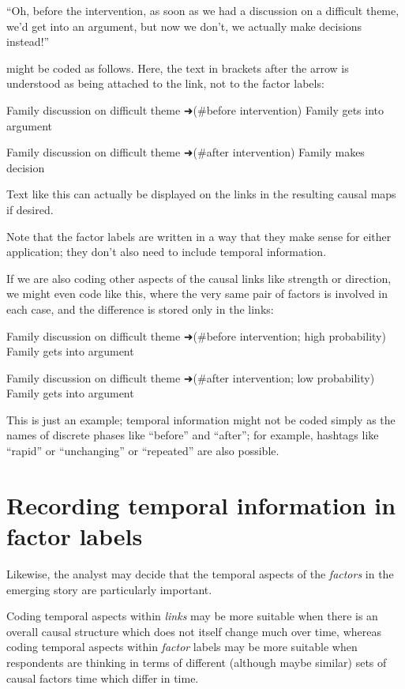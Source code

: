 \documentclass[
]{book}
\begin{document}
``Oh, before the intervention, as soon as we had a discussion on a difficult theme, we'd get into an argument, but now we don't, we actually make decisions instead!''

might be coded as follows. Here, the text in brackets after the arrow is understood as being attached to the link, not to the factor labels:

Family discussion on difficult theme ➜(\#before intervention) Family gets into argument

Family discussion on difficult theme ➜(\#after intervention) Family makes decision

Text like this can actually be displayed on the links in the resulting causal maps if desired.

Note that the factor labels are written in a way that they make sense for either application; they don't also need to include temporal information.

If we are also coding other aspects of the causal links like strength or direction, we might even code like this, where the very same pair of factors is involved in each case, and the difference is stored only in the links:

Family discussion on difficult theme ➜(\#before intervention; high probability) Family gets into argument

Family discussion on difficult theme ➜(\#after intervention; low probability) Family gets into argument

This is just an example; temporal information might not be coded simply as the names of discrete phases like ``before'' and ``after''; for example, hashtags like ``rapid'' or ``unchanging'' or ``repeated'' are also possible.

\hypertarget{recording-temporal-information-in-factor-labels}{%
\section{Recording temporal information in factor labels}\label{recording-temporal-information-in-factor-labels}}

Likewise, the analyst may decide that the temporal aspects of the \emph{factors} in the emerging story are particularly important.

Coding temporal aspects within \emph{links} may be more suitable when there is an overall causal structure which does not itself change much over time, whereas coding temporal aspects within \emph{factor} labels may be more suitable when respondents are thinking in terms of different (although maybe similar) sets of causal factors time which differ in time.
\end{document}
